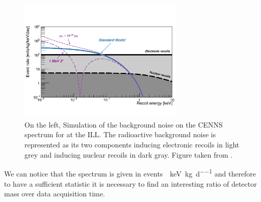 \begin{figure}
\centering
\includegraphics[width=0.7\textwidth]{Figures/Introduction/cenns_spectrum_ill.pdf}
\caption{On the left, Simulation of the background noise on the CENNS spectrum for \Ricochet{} at the ILL. The radioactive background noise is represented as its two components inducing electronic recoils in light grey and inducing nuclear recoils in dark gray. Figure taken from \cite{Billard:2018jnl}.}
\label{fig:cenns-new-physics}
\end{figure}

We can notice that the spectrum is given in \si{events \per \kilo\eV \per \kg \per \day} and therefore to have a sufficient statistic it is necessary to find an interesting ratio of detector mass over data acquisition time.


